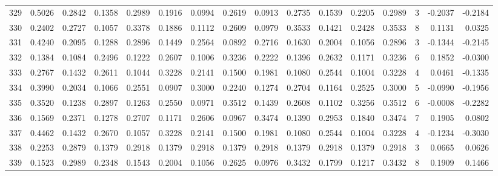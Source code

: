 \begin{tabular}{lrrrrrrrrrrrrrrr}
329 &      0.5026 &  0.2842 &  0.1358 &  0.2989 &  0.1916 &  0.0994 &  0.2619 &  0.0913 &  0.2735 &  0.1539 &   0.2205 &     0.2989 &      3 &                   -0.2037 &                    -0.2184 \\
330 &      0.2402 &  0.2727 &  0.1057 &  0.3378 &  0.1886 &  0.1112 &  0.2609 &  0.0979 &  0.3533 &  0.1421 &   0.2428 &     0.3533 &      8 &                    0.1131 &                     0.0325 \\
331 &      0.4240 &  0.2095 &  0.1288 &  0.2896 &  0.1449 &  0.2564 &  0.0892 &  0.2716 &  0.1630 &  0.2004 &   0.1056 &     0.2896 &      3 &                   -0.1344 &                    -0.2145 \\
332 &      0.1384 &  0.1084 &  0.2496 &  0.1222 &  0.2607 &  0.1006 &  0.3236 &  0.2222 &  0.1396 &  0.2632 &   0.1171 &     0.3236 &      6 &                    0.1852 &                    -0.0300 \\
333 &      0.2767 &  0.1432 &  0.2611 &  0.1044 &  0.3228 &  0.2141 &  0.1500 &  0.1981 &  0.1080 &  0.2544 &   0.1004 &     0.3228 &      4 &                    0.0461 &                    -0.1335 \\
334 &      0.3990 &  0.2034 &  0.1066 &  0.2551 &  0.0907 &  0.3000 &  0.2240 &  0.1274 &  0.2704 &  0.1164 &   0.2525 &     0.3000 &      5 &                   -0.0990 &                    -0.1956 \\
335 &      0.3520 &  0.1238 &  0.2897 &  0.1263 &  0.2550 &  0.0971 &  0.3512 &  0.1439 &  0.2608 &  0.1102 &   0.3256 &     0.3512 &      6 &                   -0.0008 &                    -0.2282 \\
336 &      0.1569 &  0.2371 &  0.1278 &  0.2707 &  0.1171 &  0.2606 &  0.0967 &  0.3474 &  0.1390 &  0.2953 &   0.1840 &     0.3474 &      7 &                    0.1905 &                     0.0802 \\
337 &      0.4462 &  0.1432 &  0.2670 &  0.1057 &  0.3228 &  0.2141 &  0.1500 &  0.1981 &  0.1080 &  0.2544 &   0.1004 &     0.3228 &      4 &                   -0.1234 &                    -0.3030 \\
338 &      0.2253 &  0.2879 &  0.1379 &  0.2918 &  0.1379 &  0.2918 &  0.1379 &  0.2918 &  0.1379 &  0.2918 &   0.1379 &     0.2918 &      3 &                    0.0665 &                     0.0626 \\
339 &      0.1523 &  0.2989 &  0.2348 &  0.1543 &  0.2004 &  0.1056 &  0.2625 &  0.0976 &  0.3432 &  0.1799 &   0.1217 &     0.3432 &      8 &                    0.1909 &                     0.1466 \\

\end{tabular}
